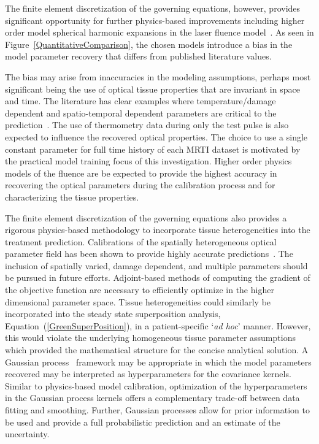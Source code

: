 \documentclass[12pt]{article}
\newcommand{\eqn}[1]{(\ref{#1})}
\begin{document}
The finite element discretization of the governing equations, however, 
provides significant opportunity for further
physics-based improvements including 
higher order model spherical harmonic expansions in the laser fluence 
model~\cite{carp2004radiative}. 
As seen in Figure~\ref{QuantitativeComparison}, the {\color{red}chosen} models
introduce a bias in the model parameter
recovery that differs from published literature values.
{\color{red}The bias may arise from inaccuracies in the modeling assumptions, perhaps
most significant being the use of optical tissue properties that are
invariant in space and time. The literature has clear examples
where temperature/damage dependent and spatio-temporal dependent
parameters are critical to the
prediction~\cite{Mohammed05,Schutt2008}. The use of thermometry data during
only the test pulse is also expected to influence the recovered optical
properties.
The choice to use a single constant parameter for full time history of each
MRTI dataset is motivated by
the practical model training focus of this investigation.
Higher order physics
models of the fluence are be expected to provide the highest accuracy in
recovering the optical parameters during the calibration process and for
characterizing the tissue properties.


 }

The finite element discretization of the governing equations
also provides a rigorous physics-based methodology to 
incorporate tissue heterogeneities into the treatment prediction.
Calibrations of the spatially heterogeneous 
optical parameter field has been shown to provide highly accurate 
predictions~\cite{fuentes2013inverse,Dilleretal07,Fengetal08}.
{\color{red} The inclusion of spatially varied, damage dependent, and
multiple parameters should be pursued in future efforts.}
Adjoint-based methods of computing the gradient of the objective 
function are necessary to efficiently optimize in the higher dimensional parameter space.
Tissue heterogeneities could similarly be incorporated
into the steady state superposition analysis, Equation~\eqn{GreenSuperPosition}, in a patient-specific
`\textit{ad hoc}' manner. However, this would violate the underlying homogeneous
tissue parameter assumptions which provided the mathematical
structure for the concise analytical solution.
A Gaussian process~\cite{rasmussen2006gaussian,Constantinescu2013} 
framework may be appropriate
in which the model parameters recovered may be interpreted as hyperparameters
for the covariance kernels.
Similar to physics-based model calibration, optimization of the
hyperparameters in the Gaussian process kernels offers a complementary
trade-off between data fitting and smoothing. Further, Gaussian processes allow
for prior information to be used and provide a full probabilistic prediction
and an estimate of the uncertainty. 
\end{document}

